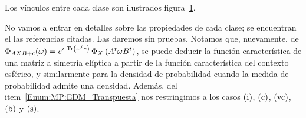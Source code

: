 %
Los v\'inculos entre cada clase son ilustrados figura~\ref{Fig:MP:EDMatrix}.
%
%
\begin{figure}[h!]
\begin{center}  \end{center}
% 
\label{Fig:MP:EDMatrix}
\end{figure}


No vamos a entrar en detalles sobre las propiedades de cada clase; se encuentran
el las referencias citadas. Las daremos sin pruebas. Notamos que, nuevamente, de
$\Phi_{A  X B  + c}(\omega)  =  e^{\imath \,  \operatorname{Tr}\left( \omega^t  c \right)}  \,
\Phi_X\left(   A^t  \omega  B^t   \right)$,  se   puede  deducir   la  funci\'on
caracter\'istica de una matriz a  simetr\'ia el\'iptica a partir de la funci\'on
caracter\'istica  del contexto esf\'erico,  y similarmente  para la  densidad de
probabilidad cuando  la medida de  probabilidad admite una  densidad.  Adem\'as,
del  item~\ref{Enum:MP:EDM_Transpuesta} nos restringimos  a los  casos $(\mathrm{i})$,
$(\mathrm{c})$, $(\mathrm{vc})$, $(\mathrm{b})$ y $(\mathrm{s})$.

